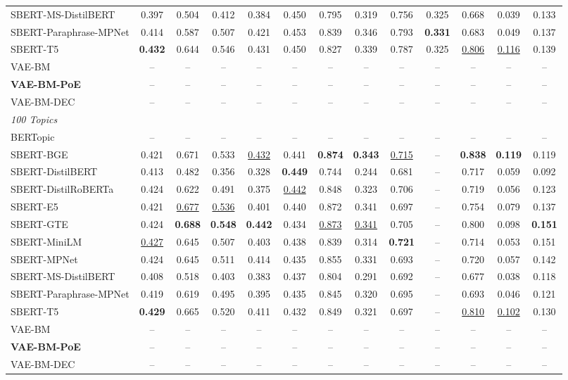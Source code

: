 \begin{table}[t]
{\begin{tabular}{lcccccccccccc}
SBERT-MS-DistilBERT & 0.397 & 0.504 & 0.412 & 0.384 & 0.450 & 0.795 & 0.319 & 0.756 & 0.325 & 0.668 & 0.039 & 0.133 \\
SBERT-Paraphrase-MPNet & 0.414 & 0.587 & 0.507 & 0.421 & 0.453 & 0.839 & 0.346 & 0.793 & \textbf{0.331} & 0.683 & 0.049 & 0.137 \\
SBERT-T5 & \textbf{0.432} & 0.644 & 0.546 & 0.431 & 0.450 & 0.827 & 0.339 & 0.787 & 0.325 & \underline{0.806} & \underline{0.116} & 0.139 \\
\midrule
VAE-BM & -- & -- & -- & -- & -- & -- & -- & -- & -- & -- & -- & -- \\
\textbf{VAE-BM-PoE} & -- & -- & -- & -- & -- & -- & -- & -- & -- & -- & -- & -- \\
VAE-BM-DEC & -- & -- & -- & -- & -- & -- & -- & -- & -- & -- & -- & -- \\
\midrule
\multicolumn{13}{l}{\textit{100 Topics}} \\
BERTopic & -- & -- & -- & -- & -- & -- & -- & -- & -- & -- & -- & -- \\
SBERT-BGE & 0.421 & 0.671 & 0.533 & \underline{0.432} & 0.441 & \textbf{0.874} & \textbf{0.343} & \underline{0.715} & -- & \textbf{0.838} & \textbf{0.119} & 0.119 \\
SBERT-DistilBERT & 0.413 & 0.482 & 0.356 & 0.328 & \textbf{0.449} & 0.744 & 0.244 & 0.681 & -- & 0.717 & 0.059 & 0.092 \\
SBERT-DistilRoBERTa & 0.424 & 0.622 & 0.491 & 0.375 & \underline{0.442} & 0.848 & 0.323 & 0.706 & -- & 0.719 & 0.056 & 0.123 \\
SBERT-E5 & 0.421 & \underline{0.677} & \underline{0.536} & 0.401 & 0.440 & 0.872 & 0.341 & 0.697 & -- & 0.754 & 0.079 & 0.137 \\
SBERT-GTE & 0.424 & \textbf{0.688} & \textbf{0.548} & \textbf{0.442} & 0.434 & \underline{0.873} & \underline{0.341} & 0.705 & -- & 0.800 & 0.098 & \textbf{0.151} \\
SBERT-MiniLM & \underline{0.427} & 0.645 & 0.507 & 0.403 & 0.438 & 0.839 & 0.314 & \textbf{0.721} & -- & 0.714 & 0.053 & 0.151 \\
SBERT-MPNet & 0.424 & 0.645 & 0.511 & 0.414 & 0.435 & 0.855 & 0.331 & 0.693 & -- & 0.720 & 0.057 & 0.142 \\
SBERT-MS-DistilBERT & 0.408 & 0.518 & 0.403 & 0.383 & 0.437 & 0.804 & 0.291 & 0.692 & -- & 0.677 & 0.038 & 0.118 \\
SBERT-Paraphrase-MPNet & 0.419 & 0.619 & 0.495 & 0.395 & 0.435 & 0.845 & 0.320 & 0.695 & -- & 0.693 & 0.046 & 0.121 \\
SBERT-T5 & \textbf{0.429} & 0.665 & 0.520 & 0.411 & 0.432 & 0.849 & 0.321 & 0.697 & -- & \underline{0.810} & \underline{0.102} & 0.130 \\
\midrule
VAE-BM & -- & -- & -- & -- & -- & -- & -- & -- & -- & -- & -- & -- \\
\textbf{VAE-BM-PoE} & -- & -- & -- & -- & -- & -- & -- & -- & -- & -- & -- & -- \\
VAE-BM-DEC & -- & -- & -- & -- & -- & -- & -- & -- & -- & -- & -- & -- \\
\bottomrule
\end{tabular}
}
\end{table}
